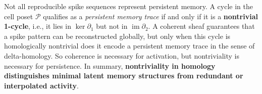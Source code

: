 \documentclass[lettersize,journal]{IEEEtran}
\begin{document}
\begin{tcolorbox}[colback=blue!5, colframe=blue!60!black, title=Key Insight: Nontriviality Implies Memory]
Not all reproducible spike sequences represent persistent memory. 
A cycle in the cell poset \( \mathcal{P} \) qualifies as a \emph{persistent memory trace} if and only if it is a \textbf{nontrivial 1-cycle}, i.e., it lies in \( \ker \partial_1 \) but not in \( \operatorname{im} \partial_2 \). 
A coherent sheaf guarantees that a spike pattern can be reconstructed globally, but only when this cycle is homologically nontrivial does it encode a persistent memory trace in the sense of delta-homology. So coherence is necessary for activation, but nontriviality is necessary for persistence. 
In summary, \textbf{nontriviality in homology distinguishes minimal latent memory structures from redundant or interpolated activity}.
\end{tcolorbox}
\end{document}
